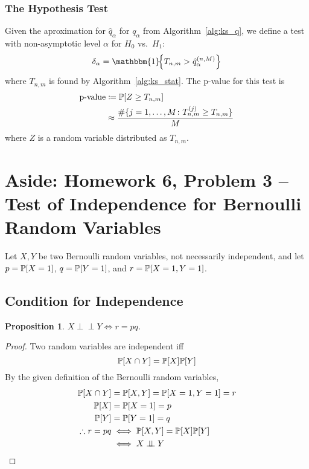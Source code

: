 \documentclass[letterpaper, reqno]{amsart}
\newtheorem{prop}{Proposition}[section]
\numberwithin{equation}{section}
\newcommand{\Prob}[1]{\mathbb{P}\mleft[#1\mright]}
\newcommand{\indep}{\perp \!\!\! \perp}  %
\newcommand{\indic}[1]{\mathbbm{1}\!\mleft\{#1\mright\}} %
\begin{document}

\subsubsection{The Hypothesis Test}
Given the aproximation for $\hat{q}_\alpha$ for $q_\alpha$ from
Algorithm~\ref{alg:ks_q}, we define a test with non-asymptotic level $\alpha$
for $H_0$ vs.\ $H_1$:
\begin{equation}
  \delta_\alpha = \indic{T_{n,m} > \hat{q}_\alpha^{(n, M)}}
\end{equation}
where $T_{n,m}$ is found by Algorithm~\ref{alg:ks_stat}. The p-value for this
test is
\begin{align}
  \text{p-value} &\coloneqq \Prob{Z \ge T_{n,m}} \\
  &\approx \frac{\#\{j = 1, \dots, M \colon T_{n,m}^{(j)} \ge T_{n,m}\}}{M}
\end{align}
where $Z$ is a random variable distributed as $T_{n,m}$.

\clearpage
\section{Aside: Homework 6, Problem 3 -- Test of Independence for Bernoulli Random Variables}
Let $X, Y$ be two Bernoulli random variables, not necessarily independent, and
let $p = \Prob{X=1}$, $q = \Prob{Y=1}$, and $r = \Prob{X=1, Y=1}$.

\subsection{Condition for Independence}
\begin{prop}
  $X \indep Y \iff r = pq$.
\end{prop}

\begin{proof}
  Two random variables are independent iff 
  \begin{equation}
    \Prob{X \cap Y} = \Prob{X}\Prob{Y} \label{eq:indep}
  \end{equation}
  By the given definition of the Bernoulli random variables,
  \begin{align*}
    \Prob{X \cap Y} &= \Prob{X, Y} = \Prob{X=1, Y=1} = r \\
    \Prob{X} &= \Prob{X=1} = p \\
    \Prob{Y} &= \Prob{Y=1} = q \\
    \therefore r = pq &\iff \Prob{X,Y} = \Prob{X}\Prob{Y} \\
    &\iff X \indep Y  \qedhere
  \end{align*}
\end{proof}
\end{document}
